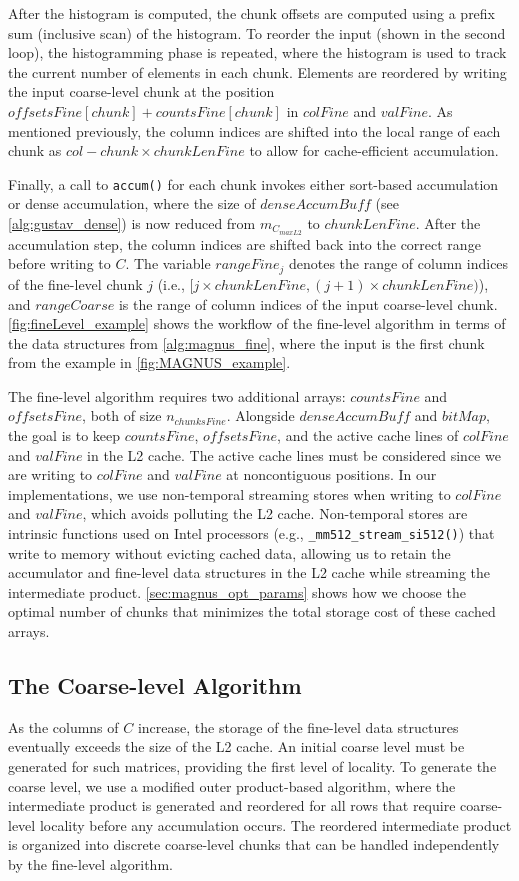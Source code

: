 After the histogram is computed, the chunk offsets are computed using a prefix sum (inclusive scan) of the histogram.
To reorder the input (shown in the second loop), the histogramming phase is repeated, where the histogram is used to track the current
number of elements in each chunk.
Elements are reordered by writing the input coarse-level chunk at the position $offsetsFine[chunk]+countsFine[chunk]$ in $colFine$ and $valFine$.
As mentioned previously, the column indices are shifted into the local range of each chunk as $col - chunk\times chunkLenFine$ to allow for cache-efficient accumulation.

Finally, a call to \texttt{accum()} for each chunk invokes either sort-based accumulation or dense accumulation, where the size of $denseAccumBuff$ (see \autoref{alg:gustav_dense}) is now reduced from $m_{C_{maxL2}}$ to $chunkLenFine$.
After the accumulation step, the column indices are shifted back into the correct range before writing to $C$.
The variable $rangeFine_j$ denotes the range of column indices of the fine-level chunk $j$ (i.e., $[j\times chunkLenFine,(j+1)\times chunkLenFine)$), and $rangeCoarse$
is the range of column indices of the input coarse-level chunk.
\autoref{fig:fineLevel_example} shows the workflow of the fine-level algorithm in terms of the data structures from \autoref{alg:magnus_fine}, where the input is the first chunk from the example in \autoref{fig:MAGNUS_example}.

\sloppy The fine-level algorithm requires two additional arrays: $countsFine$ and $offsetsFine$, both of size $n_{chunksFine}$. Alongside $denseAccumBuff$ and $bitMap$, the goal is to keep $countsFine$, $offsetsFine$, and the active cache lines of $colFine$ and $valFine$ in the L2 cache.
The active cache lines must be considered since we are writing to $colFine$ and $valFine$ at noncontiguous positions.
In our implementations, we use non-temporal streaming stores when writing to $colFine$ and $valFine$, which avoids polluting the L2 cache.
Non-temporal stores are intrinsic functions used on Intel processors (e.g., \texttt{_mm512\_stream\_si512()}) that write to memory without evicting cached data, allowing us to retain the accumulator and fine-level data structures in the L2 cache while streaming the intermediate product.
\autoref{sec:magnus_opt_params} shows how we choose the optimal number of chunks that minimizes the total storage cost of these cached arrays.

\subsection{The Coarse-level Algorithm}\label{sec:magnus_coarse}
As the columns of $C$ increase, the storage of the fine-level data structures eventually exceeds the size of the L2 cache.
An initial coarse level must be generated for such matrices, providing the first level of locality.
To generate the coarse level, we use a modified outer product-based algorithm, where the intermediate product is generated and reordered for all rows that require coarse-level locality before any accumulation occurs.
The reordered intermediate product is organized into discrete coarse-level chunks that can be handled independently by the fine-level algorithm.

